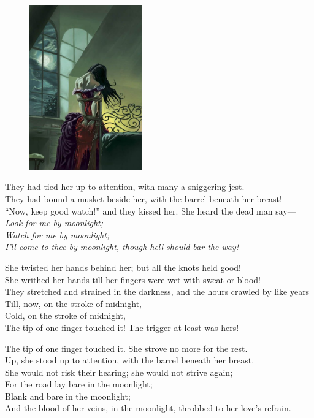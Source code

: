 \documentclass[oneside,12pt,english]{book}
\begin{document}
\begin{figure}[H]
\centering
\includegraphics[height=2.8in]{fig-04.jpg}
\end{figure}

They had tied her up to attention, with many a sniggering jest.\\
They had bound a musket beside her, with the barrel beneath her breast!\\
``Now, keep good watch!'' and they kissed her. She heard the dead man say---\\
\textit{Look for me by moonlight;\\
Watch for me by moonlight;\\
I’ll come to thee by moonlight, though hell should bar the way!}


She twisted her hands behind her; but all the knots held good!\\
She writhed her hands till her fingers were wet with sweat or blood!\\
They stretched and strained in the darkness, and the hours crawled by like
years\\
Till, now, on the stroke of midnight,\\
Cold, on the stroke of midnight,\\
The tip of one finger touched it! The trigger at least was hers!


The tip of one finger touched it. She strove no more for the rest.\\
Up, she stood up to attention, with the barrel beneath her breast.\\
She would not risk their hearing; she would not strive again;\\
For the road lay bare in the moonlight;\\
Blank and bare in the moonlight;\\
And the blood of her veins, in the moonlight, throbbed to her love’s refrain.
\end{document}
